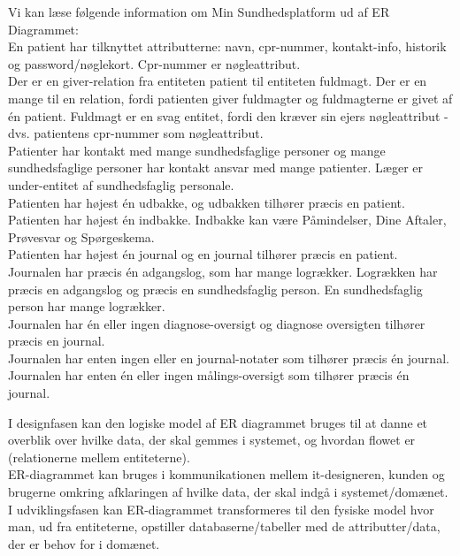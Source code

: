 Vi kan læse følgende information om Min Sundhedsplatform ud af ER Diagrammet:\\
En patient har tilknyttet attributterne: navn, cpr-nummer, kontakt-info, historik og password/nøglekort. Cpr-nummer er nøgleattribut.\\
Der er en giver-relation fra entiteten patient til entiteten fuldmagt. Der er en mange til en relation, fordi patienten giver fuldmagter og fuldmagterne er givet af én patient. Fuldmagt er en svag entitet, fordi den kræver sin ejers nøgleattribut - dvs. patientens cpr-nummer som nøgleattribut. \\
Patienter har kontakt med mange sundhedsfaglige personer og mange  sundhedsfaglige personer har kontakt ansvar med mange patienter. Læger er under-entitet af sundhedsfaglig personale. \\
Patienten har højest én udbakke, og udbakken tilhører præcis en patient.\\
Patienten har højest én indbakke. Indbakke kan være Påmindelser, Dine Aftaler, Prøvesvar og Spørgeskema.\\
Patienten har højest én journal og en journal tilhører præcis en patient. \\
Journalen har præcis én adgangslog, som har mange logrækker. Logrækken har præcis en adgangslog og præcis en sundhedsfaglig person. En sundhedsfaglig person har mange logrækker.\\
Journalen har én eller ingen diagnose-oversigt og diagnose oversigten tilhører præcis en journal.\\
Journalen har enten ingen eller en journal-notater som tilhører præcis én journal.\\
Journalen har enten én eller ingen målings-oversigt som tilhører præcis én journal.

I designfasen kan den logiske model af ER diagrammet bruges til at danne et overblik over hvilke data, der skal gemmes i systemet, og hvordan flowet er (relationerne mellem entiteterne).\\
ER-diagrammet kan bruges i kommunikationen mellem it-designeren, kunden og brugerne omkring afklaringen af hvilke data, der skal indgå i systemet/domænet. \\
I udviklingsfasen kan ER-diagrammet transformeres til den fysiske model hvor man, ud fra entiteterne, opstiller databaserne/tabeller med de attributter/data, der er behov for i domænet.

